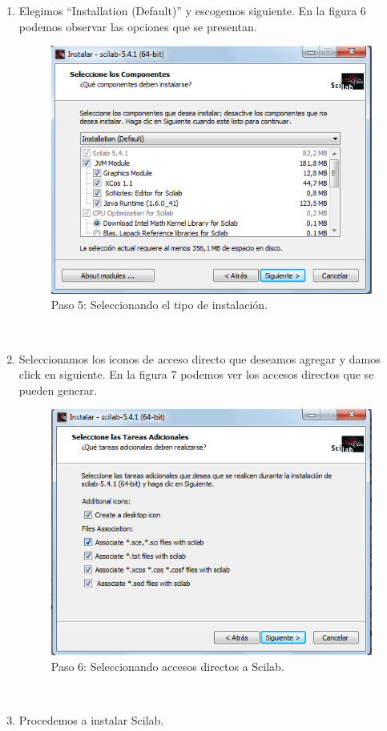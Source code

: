 \documentclass[11pt]{article} %
\begin{document}
\begin{enumerate}
\item Elegimos “Installation (Default)” y escogemos siguiente. En la figura 6 podemos observar las opciones que se presentan.
\\%
\begin{figure}[!h]
  \centering
    \includegraphics[scale=0.5]{Captura5}
  \caption{Paso 5: Seleccionando el tipo de instalación.}
  \label{fig:paso5}
\end{figure}
\\%

\item Seleccionamos los iconos de acceso directo que deseamos agregar y damos click en siguiente. 
	En la figura 7 podemos ver los accesos directos que se pueden generar.
\\%
\begin{figure}[!h]
  \centering
    \includegraphics[scale=0.5]{Captura6}
  \caption{Paso 6: Seleccionando accesos directos a Scilab.}
  \label{fig:paso6}
\end{figure}
\\%

\item Procedemos a instalar Scilab.
\end{enumerate}
\end{document}
